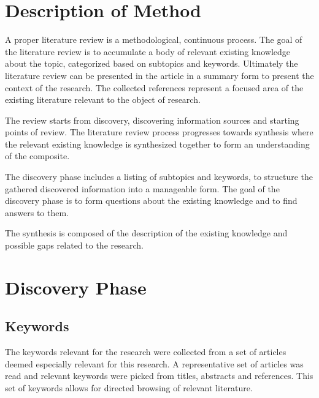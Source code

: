 \documentclass[a4paper,10pt]{article}
\begin{document}
\section{Description of Method}

A proper literature review is a methodological, continuous process. The goal of the literature review is to accumulate a body of relevant existing knowledge
about the topic, categorized based on subtopics and keywords.
Ultimately the literature review can be presented in the article in a summary form to present the context of the research.
The collected references represent a focused area of the existing literature relevant to the object of research.

The review starts from discovery, discovering information sources and starting points of review. The literature review process progresses towards synthesis
where the relevant existing knowledge is synthesized together to form an understanding of the composite.

The discovery phase includes a listing of subtopics and keywords, to structure the gathered discovered information into a manageable form. The goal
of the discovery phase is to form questions about the existing knowledge and to find answers to them.

The synthesis is composed of the description of the existing knowledge and possible gaps related to the research.

\section{Discovery Phase}

\subsection{Keywords}

The keywords relevant for the research were collected from a set of articles deemed especially relevant for this research. A representative set of articles was
read and relevant keywords were picked from titles, abstracts and references. This set of keywords allows for directed browsing of relevant literature.
\end{document}

